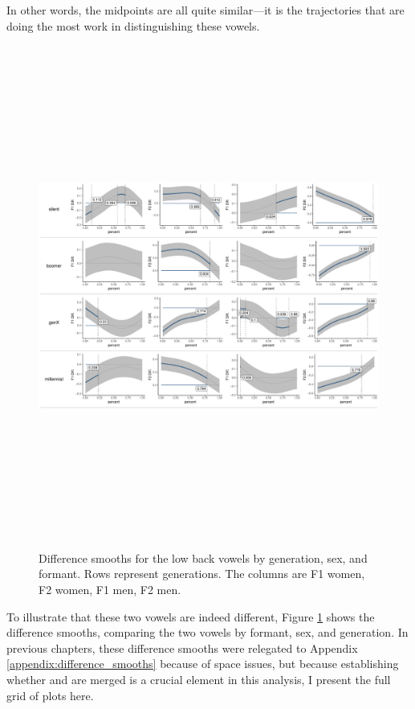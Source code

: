 In other words, the midpoints are all quite similar---it is the trajectories that are doing the most work in distinguishing these vowels.

\begin{figure}[p]
    \centering
    \includegraphics[angle=90, origin=c, height = 6.5in]{Figures/other_figures/low_back_diff_smooths.pdf}
    \caption[Difference smooths for the low back vowels]{Difference smooths for the low back vowels by generation, sex, and formant. Rows represent generations. The columns are F1 women, F2 women, F1 men, F2 men.}
    \label{fig:low_back_difference_smooths}
\end{figure}

To illustrate that these two vowels are indeed different, Figure \ref{fig:low_back_difference_smooths} shows the difference smooths, comparing the two vowels by formant, sex, and generation. In previous chapters, these difference smooths were relegated to Appendix \ref{appendix:difference_smooths} because of space issues, but because establishing whether \lot and \thought are merged is a crucial element in this analysis, I present the full grid of plots here.

